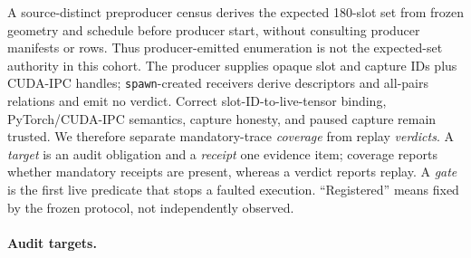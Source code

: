 \documentclass{article}
\begin{document}
A source-distinct preproducer census derives the expected 180-slot set from
frozen geometry and schedule before producer start, without consulting
producer manifests or rows.  Thus producer-emitted enumeration is not the
expected-set authority in this cohort.  The producer supplies opaque slot and
capture IDs plus CUDA-IPC handles; \texttt{spawn}-created receivers derive descriptors
and all-pairs relations and emit no verdict.  Correct slot-ID-to-live-tensor
binding, PyTorch/CUDA-IPC semantics, capture honesty, and paused capture remain
trusted.
We therefore separate mandatory-trace \emph{coverage} from replay
\emph{verdicts}.  A \emph{target} is an audit obligation and a \emph{receipt} one
evidence item; coverage reports whether mandatory receipts are present, whereas
a verdict reports replay.  A \emph{gate} is the first live predicate that stops
a faulted execution.  ``Registered'' means fixed by the frozen protocol, not
independently observed.

\paragraph{Audit targets.}
\end{document}
